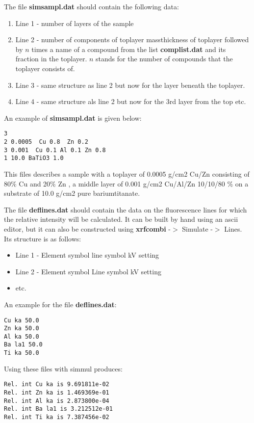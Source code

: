 The file {\bf simsampl.dat} should contain the following data:\\
\begin{enumerate}
\item Line 1 - number of layers of the sample
\item Line 2 - number of components of toplayer massthickness of toplayer
followed by $n$ times a name of a compound from the list {\bf complist.dat} and its fraction in the toplayer. $n$ stands for the number of compounds that the
toplayer consists of.
\item Line 3 - same structure as line 2 but now for the layer beneath the toplayer.
\item Line 4 - same structure als line 2 but now for the 3rd layer from the top
etc.
\end{enumerate}

An example of {\bf simsampl.dat} is given below:
\begin{verbatim}
3
2 0.0005  Cu 0.8  Zn 0.2
3 0.001  Cu 0.1 Al 0.1 Zn 0.8
1 10.0 BaTiO3 1.0
\end{verbatim}
This files describes a sample with a toplayer of 0.0005 g/cm2 Cu/Zn consisting of 80\% Cu and 20\% Zn , a middle layer of 0.001 g/cm2 Cu/Al/Zn  10/10/80 \% on
a substrate of 10.0 g/cm2 pure bariumtitanate.

The file {\bf deflines.dat} should contain the data on the fluorescence lines for 
which the relative intensity will be calculated. It can be built by hand using an ascii editor,
but it can also be constructed using {\bf xrfcombi} -$>$ Simulate -$>$ Lines.
Its structure is as follows:\\
\begin{itemize}
\item Line 1 -  Element symbol line symbol kV setting 
\item Line 2 - Element symbol Line symbol kV setting
\item etc.
\end{itemize}

An example for the file {\bf deflines.dat}:\\
\begin{verbatim}
Cu ka 50.0
Zn ka 50.0
Al ka 50.0
Ba la1 50.0
Ti ka 50.0
\end{verbatim}

Using these files with simmul produces:\\
\begin{verbatim}
Rel. int Cu ka is 9.691811e-02 
Rel. int Zn ka is 1.469369e-01 
Rel. int Al ka is 2.873800e-04 
Rel. int Ba la1 is 3.212512e-01 
Rel. int Ti ka is 7.387456e-02 
\end{verbatim}

